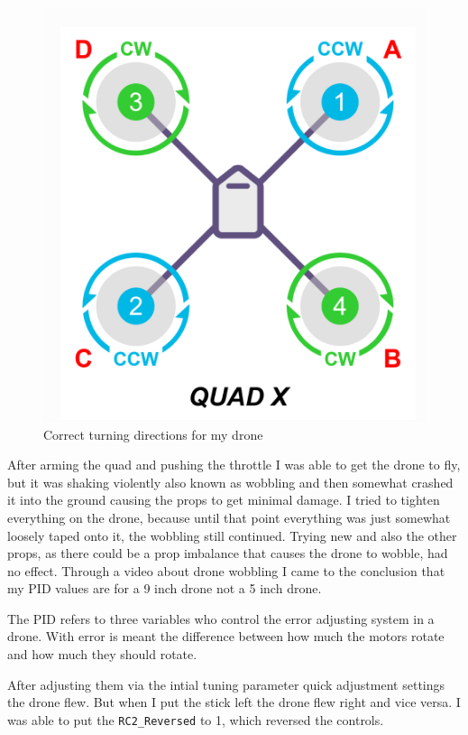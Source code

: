 \documentclass{article}
\begin{document}
\begin{figure}[h]
	\centering
	\includegraphics[scale=0.4]{pictures/quadx}
	\caption{Correct turning directions for my drone}
	\label{fig:quadx}
\end{figure}

	After arming the quad and pushing the throttle I was able to get the drone to fly, but it was shaking violently also known as wobbling and then somewhat crashed it into the ground causing the props to get minimal damage. I tried to tighten everything on the drone, because until that point everything was just somewhat loosely taped onto it, the wobbling still continued. Trying new and also the other props, as there could be a prop imbalance that causes the drone to wobble, had no effect. Through a video\cite{dronewobblevideo} about drone wobbling I came to the conclusion that my \gls{PID} values are for a 9 inch drone not a 5 inch drone. 
	\begin{Explanation}
		\item The \gls{PID} refers to three variables who control the error adjusting system in a drone. With error is meant the difference between how much the motors rotate and how much they should rotate. 
	\end{Explanation}
	After adjusting them via the intial tuning parameter quick adjustment settings the drone flew. But when I put the stick left the drone flew right and vice versa. I was able to put the \lstinline|RC2_Reversed| to 1, which reversed the controls. 
	
\end{document}
